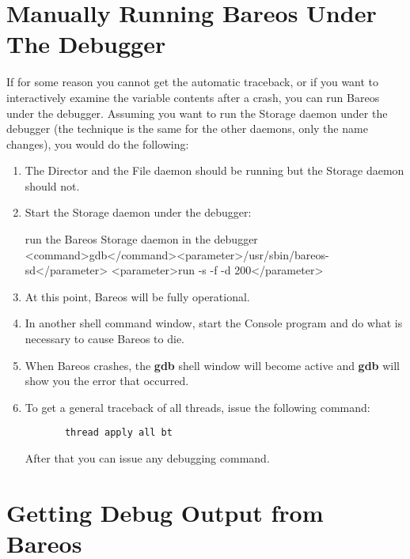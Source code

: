 \section{Manually Running Bareos Under The Debugger}

If for some reason you cannot get the automatic traceback, or if you want to
interactively examine the variable contents after a crash, you can run Bareos
under the debugger. Assuming you want to run the Storage daemon under the
debugger (the technique is the same for the other daemons, only the name
changes), you would do the following:

\begin{enumerate}
\item The Director and the File daemon should  be running but
   the Storage daemon should not.

\item Start the Storage daemon under the debugger:

\begin{commands}{run the Bareos Storage daemon in the debugger}
<command>gdb</command><parameter>/usr/sbin/bareos-sd</parameter>
<parameter>run -s -f -d 200</parameter>
\end{commands}

\item At this point, Bareos will be fully operational.

\item In another shell command window, start the Console program  and do what
   is necessary to cause Bareos to die.

\item When Bareos crashes, the {\bf gdb} shell window will  become active and
   {\bf gdb} will show you the error that  occurred.

\item To get a general traceback of all threads, issue the following  command:

\footnotesize
\begin{verbatim}
       thread apply all bt
\end{verbatim}
\normalsize

After that you can issue any debugging command.
\end{enumerate}

\section{Getting Debug Output from Bareos}
\label{debugoutput}


